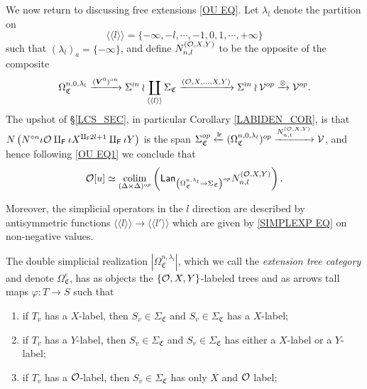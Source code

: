 \documentclass[a4paper,10pt
,draft
]{article}%
\renewcommand{\1}{\eta}%
\newcommand{\OC}{\Omega_{\mathfrak C}}
\begin{document}
We now return to discussing free extensions \eqref{OU EQ}.
%
Let $\lambda_l$ denote the partition on 
\[
\langle \langle l \rangle \rangle
=
\{-\infty,-l,\cdots,-1,0,1,\cdots,+\infty\}
\]
such that $\left(\lambda_l\right)_a = \{-\infty\}$,
and define $N_{n,l}^{(\mathcal{O},X,Y)}$ to be the opposite of the composite
\[
      \Omega_{\mathfrak C}^{n,0,\lambda_l} \xrightarrow{(\boldsymbol{V}^0)^{\circ n}}
      \Sigma^{\wr n} \wr \coprod_{\langle \langle l \rangle \rangle} \Sigma_{\mathfrak C} \xrightarrow{(\mathcal{O},X,\dots,X,Y)}
      \Sigma^{\wr n} \wr \mathcal V^{op} \xrightarrow{\otimes}
      \mathcal V^{op}.
\]
The upshot of \S \ref{LCS_SEC}, in particular Corollary \ref{LABIDEN_COR}, is that
$\mbox{$N \left(N^{\circ n} \iota \mathcal{O} \amalg_{\mathsf{F}} \iota X^{\amalg_{\mathsf{F}} 2l +1}\amalg_{\mathsf{F}} \iota Y \right)$}$
is the span
$\mbox{$\Sigma_{\mathfrak C}^{op} \xleftarrow{\mathsf{lr}} (\Omega_{\mathfrak C}^{n,0,\lambda_l})^{op} \xrightarrow{N_{n,l}^{(\mathcal{O},X,Y)}} \mathcal V$}$,
and hence following \eqref{OU EQ1} we conclude that
\begin{equation}\label{1STRED EQ}
\mathcal{O}[u] \simeq
\mathop{\operatorname{colim}}\limits_{(\Delta \times \Delta)^{op}}
\left(
	\mathsf{Lan}_{\left(\Omega_{\mathfrak C}^{n,\lambda_l} \to \Sigma_{\mathfrak C}\right)^{op}} N_{n,l}^{(\mathcal{O},X,Y)}
\right).
\end{equation}


Moreover, the simplicial operators in the $l$ direction are described by antisymmetric functions $\langle \langle l \rangle \rangle
 \to \langle \langle l' \rangle \rangle
$
which are given by \eqref{SIMPLEXP EQ} on non-negative values.


\begin{proposition}\label{EXTENTREE PROP}
The double simplicial realization
$|\Omega_{\mathfrak C}^{n,\lambda_l}|$,
which we call the \textit{extension tree category}
and denote
$\OC^e$, has as objects the 
$\{\mathcal{O},X,Y\}$-labeled trees
and as arrows tall maps $\varphi \colon T \to S$ such that
\begin{enumerate}[label=(\roman*)]
\item if $T_v$ has a $X$-label, then 
$S_v \in \Sigma_{\mathfrak{C}}$ and
$S_v \in \Sigma_{\mathfrak{C}}$ has a $X$-label;
\item if $T_v$ has a $Y$-label, then 
$S_v \in \Sigma_{\mathfrak{C}}$ and
$S_v \in \Sigma_{\mathfrak{C}}$ has either a $X$-label or a $Y$-label;
\item if $T_v$ has a $\mathcal{O}$-label, then 
$S_v \in \Sigma_{\mathfrak{C}}$ has only $X$ and $\mathcal{O}$ label;
\end{enumerate}
\end{proposition}
\end{document}
